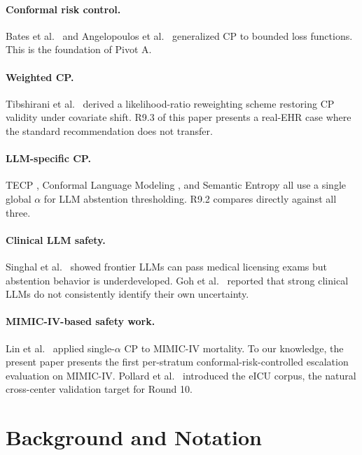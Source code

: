 \documentclass[11pt,letterpaper]{article}
\begin{document}
\paragraph{Conformal risk control.} Bates et al.\ \cite{Bates2023outliers}
and Angelopoulos et al.\ \cite{Angelopoulos2024CRC} generalized CP to
bounded loss functions. This is the foundation of Pivot A.

\paragraph{Weighted CP.} Tibshirani et al.\ \cite{Tibshirani2019} derived a
likelihood-ratio reweighting scheme restoring CP validity under covariate
shift. R9.3 of this paper presents a real-EHR case where the standard
recommendation does not transfer.

\paragraph{LLM-specific CP.} TECP \cite{XuLuTECP2025}, Conformal Language
Modeling \cite{Quach2024CLM}, and Semantic Entropy \cite{Farquhar2024SE}
all use a single global $\alpha$ for LLM abstention thresholding. R9.2
compares directly against all three.

\paragraph{Clinical LLM safety.} Singhal et al.\ \cite{Singhal2023} showed
frontier LLMs can pass medical licensing exams but abstention behavior is
underdeveloped. Goh et al.\ \cite{Goh2024} reported that strong clinical
LLMs do not consistently identify their own uncertainty.

\paragraph{MIMIC-IV-based safety work.} Lin et al.\ \cite{LinMIMICCP2024}
applied single-$\alpha$ CP to MIMIC-IV mortality. To our knowledge, the
present paper presents the first per-stratum conformal-risk-controlled
escalation evaluation on MIMIC-IV. Pollard et al.\ \cite{Pollard2018eICU}
introduced the eICU corpus, the natural cross-center validation target for
Round 10.

\section{Background and Notation}
\end{document}
